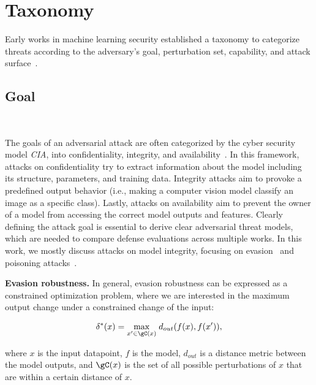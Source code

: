 \section{Taxonomy}

Early works in machine learning security established a taxonomy to categorize threats according to the adversary's goal, perturbation set, capability, and attack surface~\citep{barreno_can_2006, barreno_security_2010, papernot_practical_2017, carlini_evaluating_2019}.

\subsection{Goal}~\label{sec:tax-evasion} 

The goals of an adversarial attack are often categorized by the cyber security model \emph{CIA}, into confidentiality, integrity, and availability~\citep{barreno_can_2006}. In this framework, attacks on confidentiality try to extract information about the model including its structure, parameters, and training data. Integrity attacks aim to provoke a predefined output behavior (i.e., making a computer vision model classify an image as a specific class). Lastly, attacks on availability aim to prevent the owner of a model from accessing the correct model outputs and features. Clearly defining the attack goal is essential to derive clear adversarial threat models, which are needed to compare defense evaluations across multiple works. In this work, we mostly discuss attacks on model integrity, focusing on evasion~\cite{} and poisoning attacks~\cite{}. 

\textbf{Evasion robustness.} In general, evasion robustness can be expressed as a constrained optimization problem, where we are interested in the maximum output change under a constrained change of the input:

\begin{equation}\label{eq:adv-goal-evasion}
    \begin{aligned}
    \delta^*(x) = \max_{x' \in \gC(x)} \; & d_{out} (f(x), f(x')),  \\ 
    \end{aligned}
\end{equation}

where $x$ is the input datapoint, $f$ is the model, $d_{out}$ is a distance metric between the model outputs, and $\gC(x)$ is the set of all possible perturbations of $x$ that are within a certain distance of $x$. %

